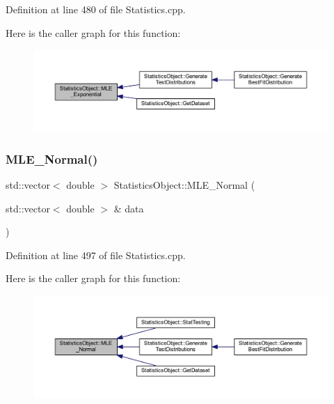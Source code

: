 Definition at line 480 of file Statistics.\+cpp.

Here is the caller graph for this function\+:
\nopagebreak
\begin{figure}[H]
\begin{center}
\leavevmode
\includegraphics[width=350pt]{class_statistics_object_a39d960b11bc70f9d402b4f2fb8c31296_icgraph}
\end{center}
\end{figure}
\mbox{\label{class_statistics_object_ab81aca627b51bbe20e71ac8ded5cf666}} 
\subsubsection{\texorpdfstring{M\+L\+E\+\_\+\+Normal()}{MLE\_Normal()}}
{\footnotesize\ttfamily std\+::vector$<$ double $>$ Statistics\+Object\+::\+M\+L\+E\+\_\+\+Normal (\begin{DoxyParamCaption}\item[{std\+::vector$<$ double $>$ \&}]{data }\end{DoxyParamCaption})\hspace{0.3cm}{\ttfamily [protected]}}



Definition at line 497 of file Statistics.\+cpp.

Here is the caller graph for this function\+:
\nopagebreak
\begin{figure}[H]
\begin{center}
\leavevmode
\includegraphics[width=350pt]{class_statistics_object_ab81aca627b51bbe20e71ac8ded5cf666_icgraph}
\end{center}
\end{figure}
\mbox{\label{class_statistics_object_af0888138520ad6df0c1c84cd3862c6c2}} 
